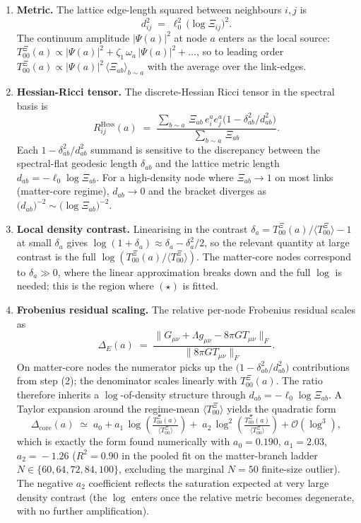 \begin{enumerate}
\item \textbf{Metric.} The lattice edge-length squared between
neighbours $i,j$ is
\[
d_{ij}^{2} \;=\; \ell_{0}^{2}\,\bigl(\log\Xi_{ij}\bigr)^{2}.
\]
The continuum amplitude $|\Psi(a)|^{2}$ at node $a$ enters as
the local source: $T_{00}^{\Xi}(a) \propto |\Psi(a)|^{2} +
\zeta_{1}\,\omega_{a}\,|\Psi(a)|^{2}+\dots$, so to leading order
$T_{00}^{\Xi}(a) \propto |\Psi(a)|^{2}\,\langle\Xi_{ab}\rangle_{b\sim a}$
with the average over the link-edges.

\item \textbf{Hessian-Ricci tensor.} The discrete-Hessian Ricci
tensor in the spectral basis is
\[
R^{\mathrm{Hess}}_{ij}(a) \;=\;
\frac{\sum_{b\sim a}\,\Xi_{ab}\,e^{a}_{i}e^{a}_{j}
       \bigl(1 - \delta_{ab}^{2}/d_{ab}^{2}\bigr)}
     {\sum_{b\sim a}\,\Xi_{ab}}.
\]
Each $1 - \delta_{ab}^{2}/d_{ab}^{2}$ summand is sensitive to
the discrepancy between the spectral-flat geodesic length
$\delta_{ab}$ and the lattice metric length $d_{ab}=
-\ell_{0}\log\Xi_{ab}$. For a high-density node where
$\Xi_{ab}\to 1$ on most links (matter-core regime),
$d_{ab}\to 0$ and the bracket diverges as
$\bigl(d_{ab}\bigr)^{-2} \sim \bigl(\log\Xi_{ab}\bigr)^{-2}$.

\item \textbf{Local density contrast.} Linearising in the
contrast $\delta_{a}\!=\!T_{00}^{\Xi}(a)/\langle
T_{00}^{\Xi}\rangle - 1$ at small $\delta_{a}$ gives
$\log(1+\delta_{a}) \approx \delta_{a} - \delta_{a}^{2}/2$, so
the relevant quantity at large contrast is the full
$\log(T_{00}^{\Xi}(a)/\langle T_{00}^{\Xi}\rangle)$. The
matter-core nodes correspond to $\delta_{a}\gg 0$, where the
linear approximation breaks down and the full $\log$ is
needed; this is the region where $(\star)$ is fitted.

\item \textbf{Frobenius residual scaling.} The relative per-node
Frobenius residual scales as
\[
\Delta_{E}(a) \;=\; \frac{\|G_{\mu\nu}+\Lambda g_{\mu\nu}-8\pi G T_{\mu\nu}\|_{F}}
                          {\|8\pi G T_{\mu\nu}\|_{F}}.
\]
On matter-core nodes the numerator picks up the
$\bigl(1-\delta_{ab}^{2}/d_{ab}^{2}\bigr)$ contributions from
step (2); the denominator scales linearly with $T_{00}^{\Xi}(a)$.
The ratio therefore inherits a $\log$-of-density structure
through $d_{ab}=-\ell_{0}\log\Xi_{ab}$. A Taylor expansion
around the regime-mean $\langle T_{00}^{\Xi}\rangle$ yields the
quadratic form
\[
\Delta_{\mathrm{core}}(a) \;\simeq\; a_{0} + a_{1}\,
\log\!\left(\tfrac{T_{00}^{\Xi}(a)}{\langle T_{00}^{\Xi}\rangle}\right)
+\; a_{2}\,\log^{2}\!\left(\tfrac{T_{00}^{\Xi}(a)}{\langle T_{00}^{\Xi}\rangle}\right) + \mathcal O(\log^{3}),
\]
which is exactly the form found numerically with
$a_{0}\!=\!0.190$, $a_{1}\!=\!2.03$, $a_{2}\!=\!-1.26$
($R^{2}=0.90$ in the pooled fit on the matter-branch ladder
$N\!\in\!\{60,64,72,84,100\}$, excluding the marginal $N=50$
finite-size outlier). The negative $a_{2}$ coefficient
reflects the saturation expected at very large density
contrast (the $\log$ enters once the relative metric becomes
degenerate, with no further amplification).
\end{enumerate}

